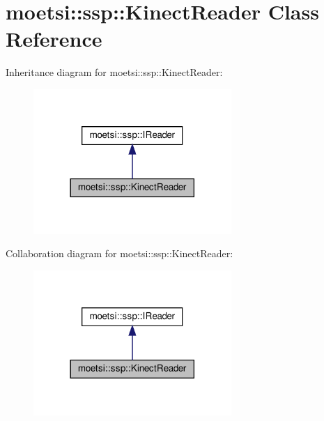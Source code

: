 \hypertarget{classmoetsi_1_1ssp_1_1KinectReader}{}\section{moetsi\+:\+:ssp\+:\+:Kinect\+Reader Class Reference}
\label{classmoetsi_1_1ssp_1_1KinectReader}


Inheritance diagram for moetsi\+:\+:ssp\+:\+:Kinect\+Reader\+:
\nopagebreak
\begin{figure}[H]
\begin{center}
\leavevmode
\includegraphics[width=213pt]{classmoetsi_1_1ssp_1_1KinectReader__inherit__graph}
\end{center}
\end{figure}


Collaboration diagram for moetsi\+:\+:ssp\+:\+:Kinect\+Reader\+:
\nopagebreak
\begin{figure}[H]
\begin{center}
\leavevmode
\includegraphics[width=213pt]{classmoetsi_1_1ssp_1_1KinectReader__coll__graph}
\end{center}
\end{figure}
